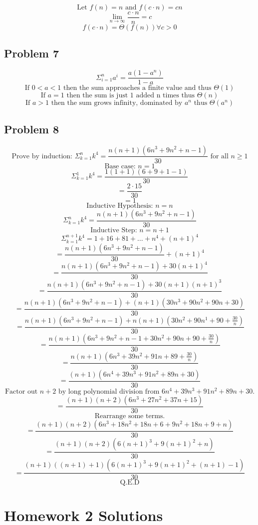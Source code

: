 \documentclass{article}
\begin{document}
$$\text{Let } f(n) = n \text{ and } f(c \cdot n) = cn$$
$$\lim_{n \rightarrow \infty} \frac{c \cdot n}{n} = c$$
$$f(c \cdot n) = \Theta(f(n)) \forall c > 0$$

\subsection{Problem 7}

$$\Sigma_{i=1}^{n} a^i = \frac{a(1-a^n)}{1-a}$$
$$\text{If } 0 < a < 1 \text{ then the sum approaches a finite value and thus } \Theta(1)$$
$$\text{If } a = 1 \text{ then the sum is just 1 added n times thus } \Theta(n)$$
$$\text{If } a > 1 \text{ then the sum grows infinity, dominated by } a^n \text{ thus } \Theta(a^n)$$

\subsection{Problem 8}

$$\text{Prove by induction: } \Sigma_{k=1}^{n} k^4 = \frac{n(n+1)(6n^3 + 9n^2 + n - 1)}{30} \text{ for all } n \ge 1$$
$$\text{Base case: } n = 1 $$
$$\Sigma_{k=1}^{1} k^4 = \frac{1(1+1)(6+9+1-1)}{30}$$
$$= \frac{2\cdot15}{30}$$
$$= 1 $$
$$\text{Inductive Hypothesis: } n = n$$
$$\Sigma_{k=1}^{n} k^4 = \frac{n(n+1)(6n^3 + 9n^2 + n - 1)}{30}$$
$$\text{Inductive Step: } n = n+1$$
$$\Sigma_{k=1}^{n+1} k^4 = 1 + 16 + 81 + \dots + n^4 + (n+1)^4$$
$$= \frac{n(n+1)(6n^3 + 9n^2 + n - 1)}{30} + (n+1)^4$$
$$= \frac{n(n+1)(6n^3 + 9n^2 + n - 1) + 30(n+1)^4}{30} $$
$$= \frac{n(n+1)(6n^3 + 9n^2 + n - 1) + 30(n+1)(n+1)^3}{30} $$
$$= \frac{n(n+1)(6n^3 + 9n^2 + n - 1) + (n+1)(30n^3 + 90n^2 + 90n +30)}{30} $$
$$= \frac{n(n+1)(6n^3 + 9n^2 + n - 1) + n(n+1)(30n^2 + 90n^1 + 90 + \frac{30}{n})}{30} $$
$$= \frac{n(n+1)(6n^3 + 9n^2 + n - 1 + 30n^2 + 90n + 90 + \frac{30}{n})}{30} $$
$$= \frac{n(n+1)(6n^3 + 39n^2 + 91n + 89 + \frac{30}{n})}{30} $$
$$= \frac{(n+1)(6n^4 + 39n^3 + 91n^2 + 89n + 30)}{30} $$
$$\text{Factor out } n + 2 \text{ by long polynomial division from } 6n^4 + 39n^3 + 91n^2 + 89n + 30 \text{.}$$
$$= \frac{(n+1)(n+2)(6n^3 + 27n^2 + 37n + 15)}{30} $$
$$\text{Rearrange some terms.}$$
$$= \frac{(n+1)(n+2)(6n^3 + 18n^2 + 18n + 6 + 9n^2 + 18n + 9 + n)}{30} $$
$$= \frac{(n+1)(n+2)(6(n+1)^3 + 9(n+1)^2 + n)}{30} $$
$$= \frac{(n+1)((n + 1) + 1)(6(n+1)^3 + 9(n+1)^2 + (n + 1) - 1)}{30} $$
$$\text{Q.E.D}$$




\section{Homework 2 Solutions}
\end{document}
